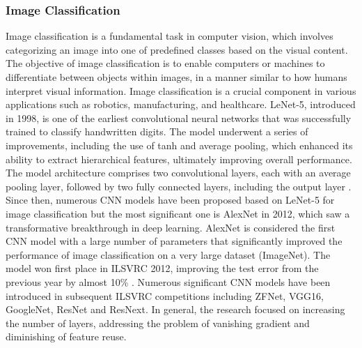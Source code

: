 \documentclass[preprint,12pt]{elsarticle}
\begin{document}
\subsubsection{Image Classification}
Image classification is a fundamental task in computer vision, which involves categorizing an image into one of predefined classes based on the visual content. The objective of image classification is to enable computers or machines to differentiate between objects within images, in a manner similar to how humans interpret visual information. Image classification is a crucial component in various applications such as robotics, manufacturing, and healthcare. LeNet-5, introduced in 1998, is one of the earliest convolutional neural networks that was successfully trained to classify handwritten digits. The model underwent a series of improvements, including the use of tanh and average pooling, which enhanced its ability to extract hierarchical features, ultimately improving overall performance. The model architecture comprises two convolutional layers, each with an average pooling layer, followed by two fully connected layers, including the output layer \citep{lecun_gradient-based_1998}. Since then, numerous CNN models have been proposed based on LeNet-5 for image classification \citep{simard_best_2003, matsugu_subject_2003} but the most significant one is AlexNet in 2012, which saw a transformative breakthrough in deep learning. AlexNet is considered the first CNN model with a large number of parameters that significantly improved the performance of image classification on a very large dataset (ImageNet). The model won first place in ILSVRC 2012, improving the test error from the previous year by almost 10\% \citep{krizhevsky_imagenet_2012}. Numerous significant CNN models have been introduced in subsequent ILSVRC competitions including ZFNet, VGG16, GoogleNet, ResNet and ResNext. In general, the research focused on increasing the number of layers, addressing the problem of vanishing gradient and diminishing of feature reuse.
\end{document}

